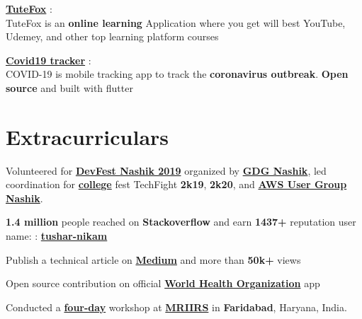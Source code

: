 \documentclass[]{deedy-resume-openfont}
\begin{document}
\begin{minipage}[t]{0.33\textwidth}
\href{https://play.google.com/store/apps/details?id=tutefox_app.com} {\bf TuteFox} : \\
\textbullet{} TuteFox is an {\bf online learning} Application where you get will best YouTube, Udemey, and other top learning platform courses \\
\sectionsep

\href{https://github.com/champ96k/coronavirus-tracker-app} {\bf Covid19 tracker} : \\
\textbullet{} COVID-19 is mobile tracking app to track the {\bf coronavirus outbreak}. {\bf Open source} and built with flutter \\
\sectionsep

\section{Extracurriculars} 

\textbullet{} Volunteered for \href{https://gdg.community.dev/events/details/google-gdg-nashik-presents-gdg-devfest-nashik-2019}{\bf DevFest Nashik 2019} organized by \href{https://gdg.community.dev/gdg-nashik}{\bf GDG Nashik}, led coordination for \href{https://siem.sandipfoundation.org}{\bf college} fest TechFight {\bf 2k19}, {\bf 2k20}, and \href{https://www.awsugnsk.in}{\bf AWS User Group Nashik}. \\
\sectionsep

\textbullet{} {\bf 1.4 million} people reached on {\bf Stackoverflow} and earn {\bf 1437+} reputation user name:   \href{https://stackoverflow.com/users/11157840/tushar-nikam}{\faStackOverflow} : \href{https://stackoverflow.com/users/11157840/tushar-nikam}{\bf  tushar-nikam}  \\
\sectionsep

\textbullet{} Publish a technical article on \href{https://champ96k.medium.com} {\bf Medium} and more than {\bf 50k+} views  \href{https://champ96k.medium.com}{\faMedium}  \\
\sectionsep

\textbullet{} Open source contribution on official \href{https://github.com/WorldHealthOrganization/app}{\bf World Health Organization} app  \href{https://github.com/WorldHealthOrganization/app}{\faGithub} \\
\sectionsep

\textbullet{} Conducted a  \href{https://gdsc.community.dev/events/details/developer-student-clubs-manav-rachna-international-institute-of-research-and-studies-faridabad-presents-flutter-fest-day-1-introduction/}{\bf four-day} workshop at \href{https://gdsc.community.dev/manav-rachna-international-institute-of-research-and-studies-faridabad}{\bf MRIIRS} in {\bf Faridabad}, Haryana, India. \\




\end{minipage} 
\end{document}
